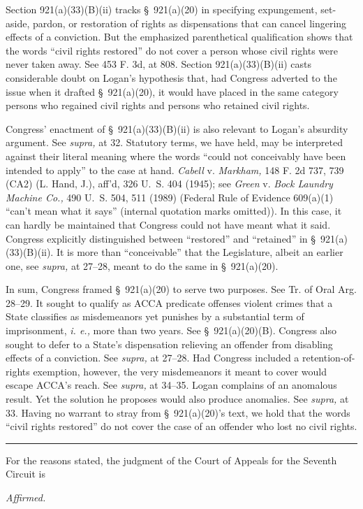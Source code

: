   Section 921(a)(33)(B)(ii) tracks \S~921(a)(20) in specifying expungement, set-aside, pardon, or restoration of rights as dispensations that can cancel lingering effects of a conviction. But the emphasized parenthetical qualification shows that the words ``civil rights restored'' do not cover a person whose civil rights were never taken away. See 453 F. 3d, at 808. Section 921(a)(33)(B)(ii) casts considerable doubt on Logan's hypothesis that, had Congress adverted to the issue when it drafted \S~921(a)(20), it would have placed in the same category persons who regained civil rights and persons who retained civil rights.

  Congress' enactment of \S~921(a)(33)(B)(ii) is also relevant to Logan's absurdity argument. See \emph{supra,} at 32. Statutory terms, we have held, may be interpreted against their literal meaning where the words ``could not conceivably have been intended to apply'' to the case at hand. \emph{Cabell} v. \emph{Markham,} 148 F. 2d 737, 739 (CA2) (L. Hand, J.), aff'd, 326 U.~S. 404 (1945); see \emph{Green} v. \emph{Bock Laundry Machine Co.,} 490 U.~S. 504, 511 (1989) (Federal Rule of Evidence 609(a)(1) ``can't mean what it says'' (internal quotation marks omitted)). In this case, it can hardly be maintained that Congress could not have meant what it said. Congress explic\newpage itly distinguished between ``restored'' and ``retained'' in \S~921(a)(33)(B)(ii). It is more than ``conceivable'' that the Legislature, albeit an earlier one, see \emph{supra,} at 27--28, meant to do the same in \S~921(a)(20).

  In sum, Congress framed \S~921(a)(20) to serve two purposes. See Tr. of Oral Arg. 28--29. It sought to qualify as ACCA predicate offenses violent crimes that a State classifies as misdemeanors yet punishes by a substantial term of imprisonment, \emph{i. e.,} more than two years. See \S~921(a)(20)(B). Congress also sought to defer to a State's dispensation relieving an offender from disabling effects of a conviction. See \emph{supra,} at 27--28. Had Congress included a retention-of-rights exemption, however, the very misdemeanors it meant to cover would escape ACCA's reach. See \emph{supra,} at 34--35. Logan complains of an anomalous result. Yet the solution he proposes would also produce anomalies. See \emph{supra,} at 33. Having no warrant to stray from \S~921(a)(20)'s text, we hold that the words ``civil rights restored'' do not cover the case of an offender who lost no civil rights.

\hrule

  For the reasons stated, the judgment of the Court of Appeals for the Seventh Circuit is

        \emph{Affirmed.}
